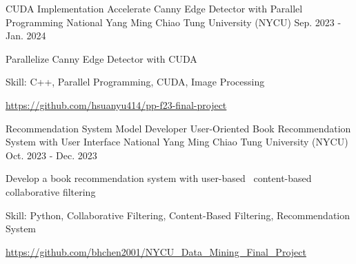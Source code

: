 

\begin{cventries}

  \cventry
    {CUDA Implementation} %
    {Accelerate Canny Edge Detector with Parallel Programming} %
    {National Yang Ming Chiao Tung University (NYCU)} %
    {Sep. 2023 - Jan. 2024} %
    {
        \begin{cvitems} %
            \item {Parallelize Canny Edge Detector with CUDA}
            \item {Skill: C++, Parallel Programming, CUDA, Image Processing}
            \item {\url{https://github.com/hsuanyu414/pp-f23-final-project}}
        \end{cvitems}
    }

  \cventry
    {Recommendation System Model Developer} %
    {User-Oriented Book Recommendation System with User Interface} %
    {National Yang Ming Chiao Tung University (NYCU)} %
    {Oct. 2023 - Dec. 2023} %
    {
        \begin{cvitems} %
            \item {Develop a book recommendation system with user-based \ content-based
                collaborative filtering}
            \item {Skill: Python, Collaborative Filtering, 
                Content-Based Filtering, Recommendation System}
            \item {\url{https://github.com/bhchen2001/NYCU_Data_Mining_Final_Project}}
        \end{cvitems}
    }


\end{cventries}
